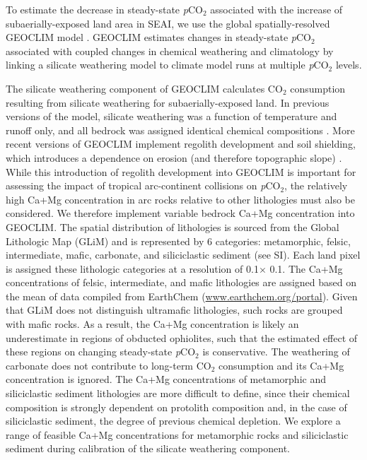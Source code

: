\documentclass[11pt,letterpaper]{article}
\newcommand{\degrees}{\textdegree\xspace}
\newcommand{\pCOtwo}{\textit{p}CO$_{2}$\xspace}
\newcommand{\COtwo}{CO$_{2}$\xspace}
\begin{document}
To estimate the decrease in steady-state \pCOtwo associated with the increase of subaerially-exposed land area in SEAI, we use the global spatially-resolved GEOCLIM model \cite{Godderis2017c}. GEOCLIM estimates changes in steady-state \pCOtwo associated with coupled changes in chemical weathering and climatology by linking a silicate weathering model to climate model runs at multiple \pCOtwo levels.

The silicate weathering component of GEOCLIM calculates \COtwo consumption resulting from silicate weathering for subaerially-exposed land. In previous versions of the model, silicate weathering was a function of temperature and runoff only, and all bedrock was assigned identical chemical compositions \cite{Godderis2017c}. More recent versions of GEOCLIM implement regolith development and soil shielding, which introduces a dependence on erosion (and therefore topographic slope) \cite{Maffre2018a}. While this introduction of regolith development into GEOCLIM is important for assessing the impact of tropical arc-continent collisions on \pCOtwo, the relatively high Ca+Mg concentration in arc rocks relative to other lithologies must also be considered. We therefore implement variable bedrock Ca+Mg concentration into GEOCLIM. The spatial distribution of lithologies is sourced from the Global Lithologic Map (GLiM) \cite{Hartmann2012a} and is represented by 6 categories: metamorphic, felsic, intermediate, mafic, carbonate, and siliciclastic sediment (see SI). Each land pixel is assigned these lithologic categories at a resolution of 0.1\degrees $\times$ 0.1\degrees. The Ca+Mg concentrations of felsic, intermediate, and mafic lithologies are assigned based on the mean of data compiled from EarthChem (\url{www.earthchem.org/portal}). Given that GLiM does not distinguish ultramafic lithologies, such rocks are grouped with mafic rocks. As a result, the Ca+Mg concentration is likely an underestimate in regions of obducted ophiolites, such that the estimated effect of these regions on changing steady-state \pCOtwo is conservative. The weathering of carbonate does not contribute to long-term \COtwo consumption and its Ca+Mg concentration is ignored. The Ca+Mg concentrations of metamorphic and siliciclastic sediment lithologies are more difficult to define, since their chemical composition is strongly dependent on protolith composition and, in the case of siliciclastic sediment, the degree of previous chemical depletion. We explore a range of feasible Ca+Mg concentrations for metamorphic rocks and siliciclastic sediment during calibration of the silicate weathering component.
\end{document}
